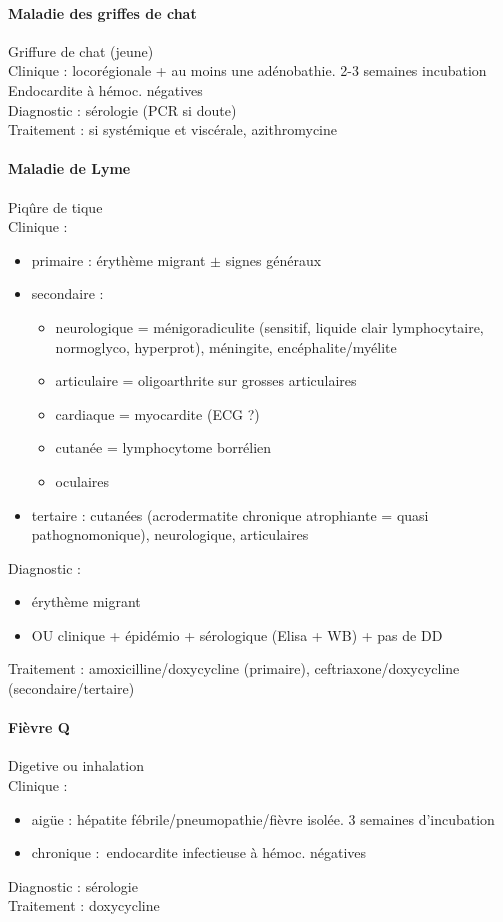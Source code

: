 \documentclass{article}
\begin{document}
\paragraph{Maladie des griffes de chat} Griffure de chat (jeune)\\
Clinique : locorégionale + au moins une adénobathie. 2-3 semaines incubation
Endocardite à hémoc. négatives\\
Diagnostic : sérologie (PCR si doute)\\
Traitement : si systémique et viscérale, azithromycine

\paragraph{Maladie de Lyme} Piqûre de tique\\
Clinique :
\begin{itemize}
  \item primaire : érythème migrant $\pm$ signes généraux
  \item secondaire : 
    \begin{itemize}
      \item neurologique = ménigoradiculite (sensitif, liquide clair
        lymphocytaire, normoglyco, hyperprot), méningite, encéphalite/myélite
      \item articulaire = oligoarthrite sur grosses articulaires
      \item cardiaque = myocardite (ECG ?)
      \item cutanée = lymphocytome borrélien
      \item oculaires 
    \end{itemize}
  \item tertaire : cutanées (acrodermatite chronique atrophiante = quasi
    pathognomonique), neurologique, articulaires
\end{itemize}
Diagnostic : 
\begin{itemize}
  \item érythème migrant
  \item OU clinique + épidémio + sérologique (Elisa + WB) + pas de DD
\end{itemize}
Traitement : amoxicilline/doxycycline (primaire), ceftriaxone/doxycycline
(secondaire/tertaire)

\paragraph{Fièvre Q} Digetive ou inhalation\\
Clinique : 
\begin{itemize}
  \item aigüe : hépatite fébrile/pneumopathie/fièvre isolée. 3 semaines d'incubation
  \item chronique : endocardite infectieuse à hémoc. négatives
\end{itemize}
Diagnostic : sérologie\\
Traitement : doxycycline
\end{document}
